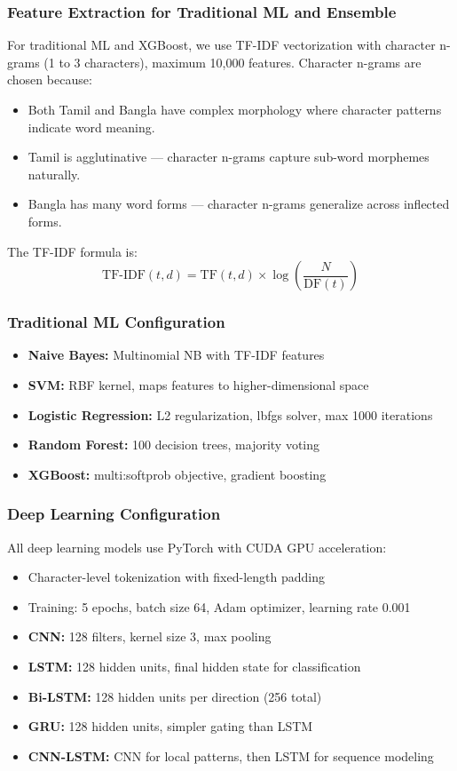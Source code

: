 \documentclass[conference]{IEEEtran}
\begin{document}
\subsubsection{Feature Extraction for Traditional ML and Ensemble}
For traditional ML and XGBoost, we use TF-IDF vectorization with character n-grams (1 to 3 characters), maximum 10,000 features. Character n-grams are chosen because:
\begin{itemize}
\item Both Tamil and Bangla have complex morphology where character patterns indicate word meaning.
\item Tamil is agglutinative --- character n-grams capture sub-word morphemes naturally.
\item Bangla has many word forms --- character n-grams generalize across inflected forms.
\end{itemize}

The TF-IDF formula is:
\begin{equation}
\text{TF-IDF}(t, d) = \text{TF}(t, d) \times \log\left(\frac{N}{\text{DF}(t)}\right)
\end{equation}

\subsubsection{Traditional ML Configuration}
\begin{itemize}
\item \textbf{Naive Bayes:} Multinomial NB with TF-IDF features
\item \textbf{SVM:} RBF kernel, maps features to higher-dimensional space
\item \textbf{Logistic Regression:} L2 regularization, lbfgs solver, max 1000 iterations
\item \textbf{Random Forest:} 100 decision trees, majority voting
\item \textbf{XGBoost:} multi:softprob objective, gradient boosting
\end{itemize}

\subsubsection{Deep Learning Configuration}
All deep learning models use PyTorch with CUDA GPU acceleration:
\begin{itemize}
\item Character-level tokenization with fixed-length padding
\item Training: 5 epochs, batch size 64, Adam optimizer, learning rate 0.001
\item \textbf{CNN:} 128 filters, kernel size 3, max pooling
\item \textbf{LSTM:} 128 hidden units, final hidden state for classification
\item \textbf{Bi-LSTM:} 128 hidden units per direction (256 total)
\item \textbf{GRU:} 128 hidden units, simpler gating than LSTM
\item \textbf{CNN-LSTM:} CNN for local patterns, then LSTM for sequence modeling
\end{itemize}
\end{document}
